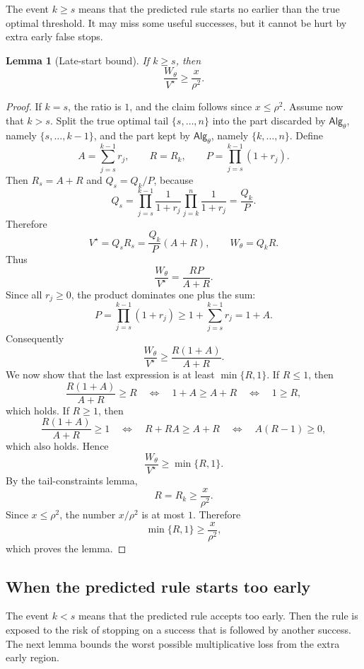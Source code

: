 \documentclass[11pt,a4paper]{article}
\newtheorem{lemma}{Lemma}
\newcommand{\alg}{\mathsf{Alg}}
\begin{document}
The event \(k\ge s\) means that the predicted rule starts no earlier than the
true optimal threshold.  It may miss some useful successes, but it cannot be
hurt by extra early false stops.

\begin{lemma}[Late-start bound]
\label{lem:late}
If \(k\ge s\), then
\[
  \frac{W_\theta}{V^\star}
  \ge
  \frac{x}{\rho^2}.
\]
\end{lemma}

\begin{proof}
If \(k=s\), the ratio is \(1\), and the claim follows since \(x\le\rho^2\).
Assume now that \(k>s\).  Split the true optimal tail \(\{s,\dots,n\}\) into the
part discarded by \(\alg_\theta\), namely \(\{s,
\dots,k-1\}\), and the part kept by \(\alg_\theta\), namely \(\{k,
\dots,n\}\).  Define
\[
  A=\sum_{j=s}^{k-1}r_j,
  \qquad
  R=R_k,
  \qquad
  P=\prod_{j=s}^{k-1}(1+r_j).
\]
Then \(R_s=A+R\) and \(Q_s=Q_k/P\), because
\[
  Q_s=\prod_{j=s}^{k-1}\frac1{1+r_j}\prod_{j=k}^n\frac1{1+r_j}
      =\frac{Q_k}{P}.
\]
Therefore
\[
  V^\star=Q_sR_s=\frac{Q_k}{P}(A+R),
  \qquad
  W_\theta=Q_kR.
\]
Thus
\[
  \frac{W_\theta}{V^\star}
  =\frac{RP}{A+R}.
\]
Since all \(r_j\ge0\), the product dominates one plus the sum:
\[
  P=\prod_{j=s}^{k-1}(1+r_j)\ge1+\sum_{j=s}^{k-1}r_j=1+A.
\]
Consequently
\[
  \frac{W_\theta}{V^\star}
  \ge
  \frac{R(1+A)}{A+R}.
\]
We now show that the last expression is at least \(\min\{R,1\}\).  If
\(R\le1\), then
\[
  \frac{R(1+A)}{A+R}\ge R
  \quad\Longleftrightarrow\quad
  1+A\ge A+R
  \quad\Longleftrightarrow\quad
  1\ge R,
\]
which holds.  If \(R\ge1\), then
\[
  \frac{R(1+A)}{A+R}\ge1
  \quad\Longleftrightarrow\quad
  R+RA\ge A+R
  \quad\Longleftrightarrow\quad
  A(R-1)\ge0,
\]
which also holds.  Hence
\[
  \frac{W_\theta}{V^\star}\ge\min\{R,1\}.
\]
By the tail-constraints lemma,
\[
  R=R_k\ge\frac{x}{\rho^2}.
\]
Since \(x\le\rho^2\), the number \(x/\rho^2\) is at most \(1\).  Therefore
\[
  \min\{R,1\}\ge\frac{x}{\rho^2},
\]
which proves the lemma.
\end{proof}

\subsection{When the predicted rule starts too early}

The event \(k<s\) means that the predicted rule accepts too early.  Then the
rule is exposed to the risk of stopping on a success that is followed by another
success.  The next lemma bounds the worst possible multiplicative loss from the
extra early region.
\end{document}
